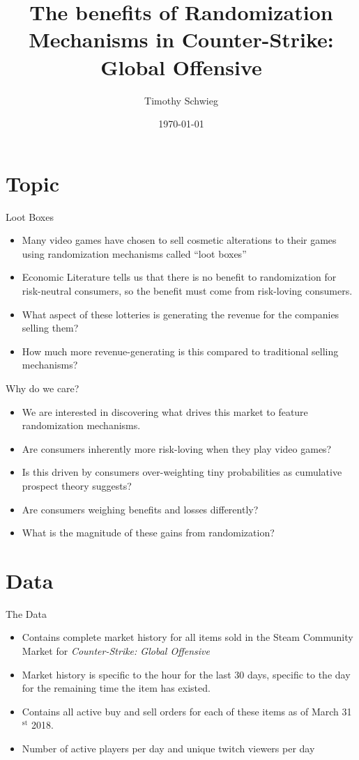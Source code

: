 \documentclass[bigger]{beamer}
\author{Timothy Schwieg}
\date{\today}
\title{The benefits of Randomization Mechanisms in Counter-Strike: Global Offensive}
\begin{document}
\maketitle


\section{Topic}
\label{sec:org90275fc}
\begin{frame}[label={sec:org8c25e2e}]{Loot Boxes}
\begin{itemize}
\item Many video games have chosen to sell cosmetic alterations to their
games using randomization mechanisms called ``loot boxes''
\item Economic Literature tells us that there is no benefit to
randomization for risk-neutral consumers, so the benefit must come
from risk-loving consumers.
\item What aspect of these lotteries is generating the revenue for the
companies selling them?
\item How much more revenue-generating is this compared to traditional
selling mechanisms?
\end{itemize}
\end{frame}

\begin{frame}[label={sec:orgb71bc63}]{Why do we care?}
\begin{itemize}
\item We are interested in discovering what drives this market to feature
randomization mechanisms.
\item Are consumers inherently more risk-loving when they play video
games?
\item Is this driven by consumers over-weighting tiny probabilities as
cumulative prospect theory suggests?
\item Are consumers weighing benefits and losses differently?
\item What is the magnitude of these gains from randomization?
\end{itemize}
\end{frame}

\section{Data}
\label{sec:org96b39c8}
\begin{frame}[label={sec:orgf1c9886}]{The Data}
\begin{itemize}
\item Contains complete market history for all items sold in the Steam
Community Market for \emph{Counter-Strike: Global Offensive}
\item Market history is specific to the hour for the last 30 days,
specific to the day for the remaining time the item has existed.
\item Contains all active buy and sell orders for each of these items as
of March 31\(^{\text{st}}\) 2018.
\item Number of active players per day and unique twitch viewers per day
\end{itemize}
\end{frame}
\end{document}
